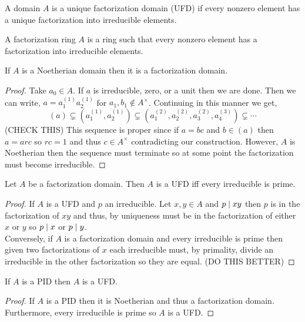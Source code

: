 \documentclass[12pt]{article}
\begin{document}
\begin{definition}
A domain $A$ is a unique factorization domain (UFD) if every nonzero element has a unique factorization into irreducible elements. 
\end{definition}

\begin{definition}
A factorization ring $A$ is a ring such that every nonzero element has a factorization into irreducible elements.
\end{definition}

\begin{lemma}
If $A$ is a Noetherian domain then it is a factorization domain.
\end{lemma}

\begin{proof}
Take $a_0 \in A$. If $a$ is irreducible, zero, or a unit then we are done. Then we can write, $a = a^{(1)}_1 a^{(1)}_2$ for $a_1, b_1 \notin A^\times$. Continuing in this manner we get,
\[ (a) \subsetneq (a^{(1)}_1, a^{(1)}_2) \subsetneq (a^{(2)}_1, a^{(2)}_2, a^{(2)}_3, a^{(3)}_4) \subsetneq \cdots \]
(CHECK THIS)
This sequence is proper since if $a = bc$ and $b \in (a)$ then $a = arc$ so $rc = 1$ and thus $c \in A^\times$ contradicting our construction. However, $A$ is Noetherian then the sequence must terminate so at some point the factorization must become irreducible. 
\end{proof}

\begin{theorem}
Let $A$ be a factorization domain. Then $A$ is a UFD iff every irreducible is prime. 
\end{theorem}

\begin{proof}
If $A$ is a UFD and $p$ an irreducible. Let $x, y \in A$ and $p \mid xy$ then $p$ is in the factorization of $xy$ and thus, by uniqueness must be in the factorization of either $x$ or $y$ so $p \mid x$ or $p \mid y$.
\bigskip\\
Conversely, if $A$ is a factorization domain and every irreducible is prime then given two factorizations of $x$ each irreducible must, by primality, divide an irreducible in the other factorization so they are equal. 
(DO THIS BETTER)
\end{proof}

\begin{corollary}
If $A$ is a PID then $A$ is a UFD.
\end{corollary}

\begin{proof}
If $A$ is a PID then it is Noetherian and thus a factorization domain. Furthermore, every irreducible is prime so $A$ is a UFD.
\end{proof}
\end{document}
